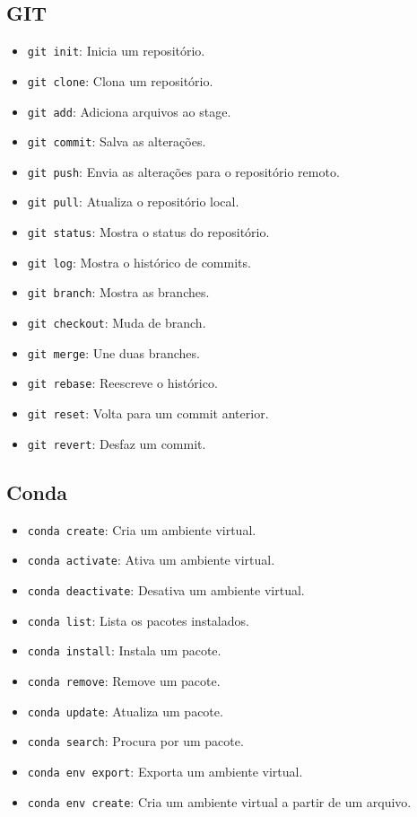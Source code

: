 \documentclass[a4paper, 12pt]{article}
\begin{document}
\subsection{GIT}\label{git}

\begin{itemize}
    \item \texttt{git init}: Inicia um repositório.
    \item \texttt{git clone}: Clona um repositório.
    \item \texttt{git add}: Adiciona arquivos ao stage.
    \item \texttt{git commit}: Salva as alterações.
    \item \texttt{git push}: Envia as alterações para o repositório remoto.
    \item \texttt{git pull}: Atualiza o repositório local.
    \item \texttt{git status}: Mostra o status do repositório.
    \item \texttt{git log}: Mostra o histórico de commits.
    \item \texttt{git branch}: Mostra as branches.
    \item \texttt{git checkout}: Muda de branch.
    \item \texttt{git merge}: Une duas branches.
    \item \texttt{git rebase}: Reescreve o histórico.
    \item \texttt{git reset}: Volta para um commit anterior.
    \item \texttt{git revert}: Desfaz um commit.
\end{itemize}

\subsection{Conda}\label{conda}

\begin{itemize}
    \item \texttt{conda create}: Cria um ambiente virtual.
    \item \texttt{conda activate}: Ativa um ambiente virtual.
    \item \texttt{conda deactivate}: Desativa um ambiente virtual.
    \item \texttt{conda list}: Lista os pacotes instalados.
    \item \texttt{conda install}: Instala um pacote.
    \item \texttt{conda remove}: Remove um pacote.
    \item \texttt{conda update}: Atualiza um pacote.
    \item \texttt{conda search}: Procura por um pacote.
    \item \texttt{conda env export}: Exporta um ambiente virtual.
    \item \texttt{conda env create}: Cria um ambiente virtual a partir de um arquivo.
\end{itemize}
\end{document}
